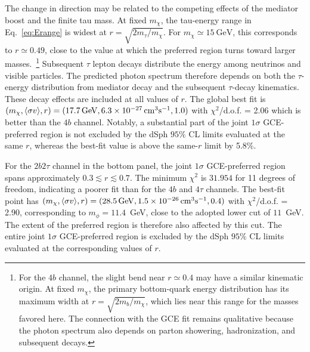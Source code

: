 \documentclass[superscriptaddress,
showpacs,preprintnumbers,nofootinbib,eqsecnum,amsmath,amssymb,aps,11pt, groupedaddress, floatfix]{revtex4-2}
\begin{document}
The change in direction may be related to the competing effects of the mediator boost and the finite tau mass.
At fixed $m_\chi$, the tau-energy range in Eq.~\eqref{eq:Erange} is widest at $r=\sqrt{2m_\tau/m_\chi}$.
For $m_\chi \simeq 15~\mathrm{GeV}$, this corresponds to
$r \simeq 0.49$, close to the value at which the preferred region turns toward larger masses.~\footnote{For the $4b$ channel, the slight bend near $r \simeq 0.4$ may have a similar kinematic origin. At fixed $m_\chi$, the primary bottom-quark energy
distribution has its maximum width at
$r=\sqrt{2m_b/m_\chi}$, which lies near this range for the masses favored here. The connection with the GCE fit remains qualitative because the photon spectrum also depends on parton showering, hadronization, and subsequent decays.}
Subsequent $\tau$ lepton decays distribute the energy among neutrinos
and visible particles.
The predicted photon spectrum therefore depends on both the
$\tau$-energy distribution from mediator decay and the subsequent $\tau$-decay kinematics.
These decay effects are included at all values of $r$.
The global best fit is $(m_\chi, \langle \sigma v \rangle, r) = (17.7\,{\rm GeV}, 6.3 \times 10^{-27}\,{\rm cm}^3{\rm s}^{-1},1.0)$ with $\chi^2$/d.o.f. = 2.06 which is better than the $4b$ channel.
Notably, a substantial part of the joint $1 \sigma$ GCE-preferred region is not excluded by the dSph $95\%$ CL
limits evaluated at the same $r$, whereas the best-fit value is above the same-$r$ limit by 5.8\%.

For the $2b2\tau$ channel in the bottom panel, the joint
$1\sigma$ GCE-preferred region spans approximately
$0.3 \lesssim r \lesssim 0.7$.
The minimum $\chi^2$ is $31.954$ for 11 degrees of freedom,
indicating a poorer fit than for the $4b$ and $4\tau$ channels.
The best-fit point has $(m_\chi, \langle \sigma v \rangle, r) = (28.5\,{\rm GeV}, 1.5 \times 10^{-26}\,{\rm cm}^3{\rm s}^{-1}, 0.4)$ with $\chi^2$/d.o.f. = 2.90,
corresponding to $m_\phi=11.4$~GeV, close to the adopted
lower cut of $11$~GeV.
The extent of the preferred region is therefore also affected
by this cut.
The entire joint $1\sigma$ GCE-preferred region is excluded
by the dSph $95\%$ CL limits evaluated at
the corresponding values of $r$.
\end{document}

